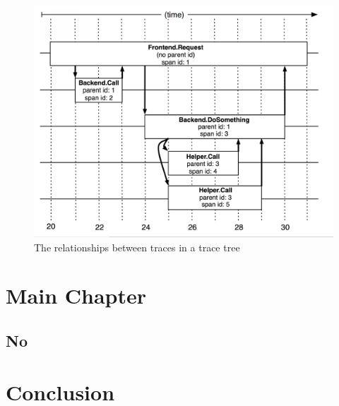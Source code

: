 \documentclass[pdftex,titlepage]{article}
\begin{document}
        \begin{figure}[htb!]
            \centering
            \includegraphics[scale=0.8]{dappertrace}
            \caption{The relationships between traces in a trace tree}
        \end{figure}


        \newpage


    \section{Main Chapter}

    \subsection{No}

    \section{Conclusion}
    
\end{document}
